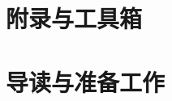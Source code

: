 \documentclass[fontsize=12pt, paper=a4, oneside, DIV=calc]{scrbook}
\theoremstyle{break}
\begin{document}
\chapter{附录与工具箱}


\chapter{导读与准备工作}





\end{document}
